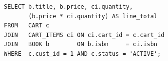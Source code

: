 \begin{lstlisting}[caption={Q2: Active cart contents for a customer}]
SELECT b.title, b.price, ci.quantity,
       (b.price * ci.quantity) AS line_total
FROM   CART c
JOIN   CART_ITEMS ci ON ci.cart_id = c.cart_id
JOIN   BOOK b        ON b.isbn     = ci.isbn
WHERE  c.cust_id = 1 AND c.status = 'ACTIVE';
\end{lstlisting}